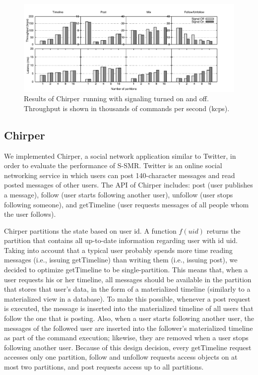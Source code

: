 \documentclass[11pt]{article}
\newcommand{\ssmr}{\mbox{S-SMR}}
\newcommand{\appname}{Chirper} %
\begin{document}
\begin{figure}
\begin{minipage}[b]{1\linewidth} %
\centering
      \includegraphics[width=1.08\linewidth]{figures/signal-vs-nosignal}
\end{minipage}
\caption{Results of \appname\ running with signaling turned on and off. Throughput is shown in thousands of commands per second (kcps).}
\label{fig:perf}
\end{figure}

\subsection{\appname}
We implemented \appname{}, a social network application similar to Twitter, in order to evaluate the performance of \ssmr{}.
Twitter is an online social networking service in which users can post 140-character messages and read posted messages of other users.
The API of \appname{} includes: post (user publishes a message), follow (user starts following another user), unfollow (user stops following someone), and getTimeline (user requests messages of all people whom the user follows).

\appname{} partitions the state based on user id. A function $f(uid)$ returns the partition that contains all up-to-date information regarding user with id uid. Taking into account that a typical user probably spends more time reading messages (i.e., issuing getTimeline) than writing them (i.e., issuing post), we decided to optimize getTimeline to be single-partition. This means that, when a user requests his or her timeline, all messages should be available in the partition that stores that user's data, in the form of a materialized timeline (similarly to a materialized view in a database). To make this possible, whenever a post request is executed, the message is inserted into the materialized timeline of all users that follow the one that is posting. Also, when a user starts following another user, the messages of the followed user are inserted into the follower's materialized timeline as part of the command execution; likewise, they are removed when a user stops following another user. Because of this design decision, every getTimeline request accesses only one partition, follow and unfollow requests access objects on at most two partitions, and post requests access up to all partitions.
\end{document}
